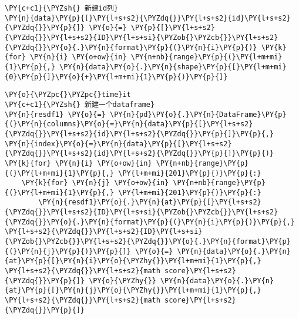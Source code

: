     \begin{tcolorbox}[breakable, size=fbox, boxrule=1pt, pad at break*=1mm,colback=cellbackground, colframe=cellborder]
\begin{Verbatim}[commandchars=\\\{\}]
\PY{c+c1}{\PYZsh{} 新建id列}
\PY{n}{data}\PY{p}{[}\PY{l+s+s2}{\PYZdq{}}\PY{l+s+s2}{id}\PY{l+s+s2}{\PYZdq{}}\PY{p}{]} \PY{o}{=} \PY{p}{[}\PY{l+s+s2}{\PYZdq{}}\PY{l+s+s2}{ID}\PY{l+s+si}{\PYZob{}\PYZcb{}}\PY{l+s+s2}{\PYZdq{}}\PY{o}{.}\PY{n}{format}\PY{p}{(}\PY{n}{i}\PY{p}{)} \PY{k}{for} \PY{n}{i} \PY{o+ow}{in} \PY{n+nb}{range}\PY{p}{(}\PY{l+m+mi}{1}\PY{p}{,} \PY{n}{data}\PY{o}{.}\PY{n}{shape}\PY{p}{[}\PY{l+m+mi}{0}\PY{p}{]}\PY{o}{+}\PY{l+m+mi}{1}\PY{p}{)}\PY{p}{]}
\end{Verbatim}
\end{tcolorbox}

    \begin{tcolorbox}[breakable, size=fbox, boxrule=1pt, pad at break*=1mm,colback=cellbackground, colframe=cellborder]
\begin{Verbatim}[commandchars=\\\{\}]
\PY{o}{\PYZpc{}\PYZpc{}time}it
\PY{c+c1}{\PYZsh{} 新建一个dataframe}
\PY{n}{resdf1} \PY{o}{=} \PY{n}{pd}\PY{o}{.}\PY{n}{DataFrame}\PY{p}{(}\PY{n}{columns}\PY{o}{=}\PY{n}{data}\PY{p}{[}\PY{l+s+s2}{\PYZdq{}}\PY{l+s+s2}{id}\PY{l+s+s2}{\PYZdq{}}\PY{p}{]}\PY{p}{,} \PY{n}{index}\PY{o}{=}\PY{n}{data}\PY{p}{[}\PY{l+s+s2}{\PYZdq{}}\PY{l+s+s2}{id}\PY{l+s+s2}{\PYZdq{}}\PY{p}{]}\PY{p}{)}
\PY{k}{for} \PY{n}{i} \PY{o+ow}{in} \PY{n+nb}{range}\PY{p}{(}\PY{l+m+mi}{1}\PY{p}{,} \PY{l+m+mi}{201}\PY{p}{)}\PY{p}{:}
    \PY{k}{for} \PY{n}{j} \PY{o+ow}{in} \PY{n+nb}{range}\PY{p}{(}\PY{l+m+mi}{1}\PY{p}{,} \PY{l+m+mi}{201}\PY{p}{)}\PY{p}{:}
        \PY{n}{resdf1}\PY{o}{.}\PY{n}{at}\PY{p}{[}\PY{l+s+s2}{\PYZdq{}}\PY{l+s+s2}{ID}\PY{l+s+si}{\PYZob{}\PYZcb{}}\PY{l+s+s2}{\PYZdq{}}\PY{o}{.}\PY{n}{format}\PY{p}{(}\PY{n}{i}\PY{p}{)}\PY{p}{,} \PY{l+s+s2}{\PYZdq{}}\PY{l+s+s2}{ID}\PY{l+s+si}{\PYZob{}\PYZcb{}}\PY{l+s+s2}{\PYZdq{}}\PY{o}{.}\PY{n}{format}\PY{p}{(}\PY{n}{j}\PY{p}{)}\PY{p}{]} \PY{o}{=} \PY{n}{data}\PY{o}{.}\PY{n}{at}\PY{p}{[}\PY{n}{i}\PY{o}{\PYZhy{}}\PY{l+m+mi}{1}\PY{p}{,} \PY{l+s+s2}{\PYZdq{}}\PY{l+s+s2}{math score}\PY{l+s+s2}{\PYZdq{}}\PY{p}{]} \PY{o}{\PYZhy{}} \PY{n}{data}\PY{o}{.}\PY{n}{at}\PY{p}{[}\PY{n}{j}\PY{o}{\PYZhy{}}\PY{l+m+mi}{1}\PY{p}{,} \PY{l+s+s2}{\PYZdq{}}\PY{l+s+s2}{math score}\PY{l+s+s2}{\PYZdq{}}\PY{p}{]}
\end{Verbatim}
\end{tcolorbox}

